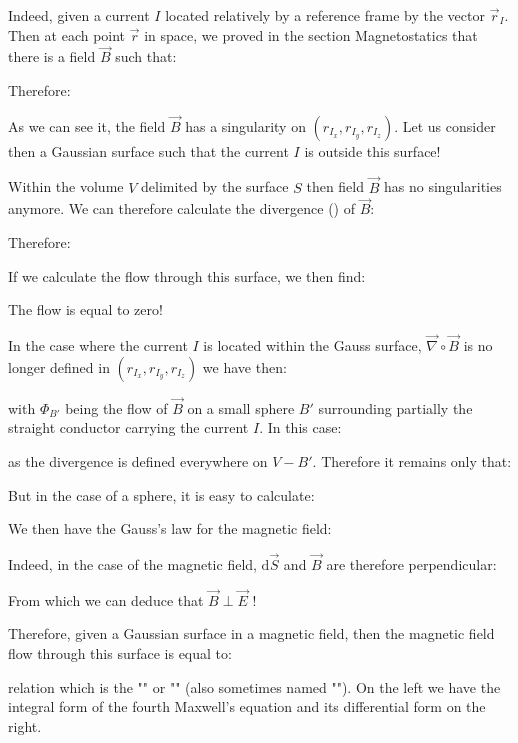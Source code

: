 	Indeed, given a current $I$ located relatively by a reference frame by the vector $\vec{r}_I$. Then at each point $\vec{r}$ in space, we proved in the section Magnetostatics that there is a field $\vec{B}$ such that:
	
	Therefore:
	
	As we can see it, the field $\vec{B}$ has a singularity on $(r_{I_x},r_{I_y},r_{I_z})$. Let us consider then a Gaussian surface such that the current $I$ is outside this surface!

	Within the volume $V$ delimited by the surface $S$ then field $\vec{B}$ has no singularities anymore. We can therefore calculate the divergence () of $\vec{B}$:
	
	Therefore:
	
	If we calculate the flow through this surface, we then find:
	
	The flow is equal to zero!
	
	In the case where the current $I$ is located within the Gauss surface, $\vec{\nabla}\circ\vec{B}$ is no longer defined in $(r_{I_x},r_{I_y},r_{I_z})$ we have then:
	
	with $\Phi_{B'}$ being the flow of $\vec{B}$ on a small sphere $B'$ surrounding partially the straight conductor carrying the current $I$. In this case:
	
	as the divergence is defined everywhere on $V-B'$. Therefore it remains only that:
	
	But in the case of a sphere, it is easy to calculate:
	
	We then have the Gauss's law for the magnetic field:
	
	Indeed, in the case of the magnetic field, $\mathrm{d}\vec{S}$ and $\vec{B}$ are therefore perpendicular:
	
	\begin{tcolorbox}[title=Remark,colframe=black,arc=10pt]
	From which we can deduce that $\vec{B} \perp\vec{E}$ !
	\end{tcolorbox}
	Therefore, given a Gaussian surface in a magnetic field, then the magnetic field flow through this surface is equal to:
	
	relation which is the "" or "\label{gauss law for magnetism}" (also sometimes named ""). On the left we have the integral form of the fourth Maxwell's equation and its differential form on the right.
	
